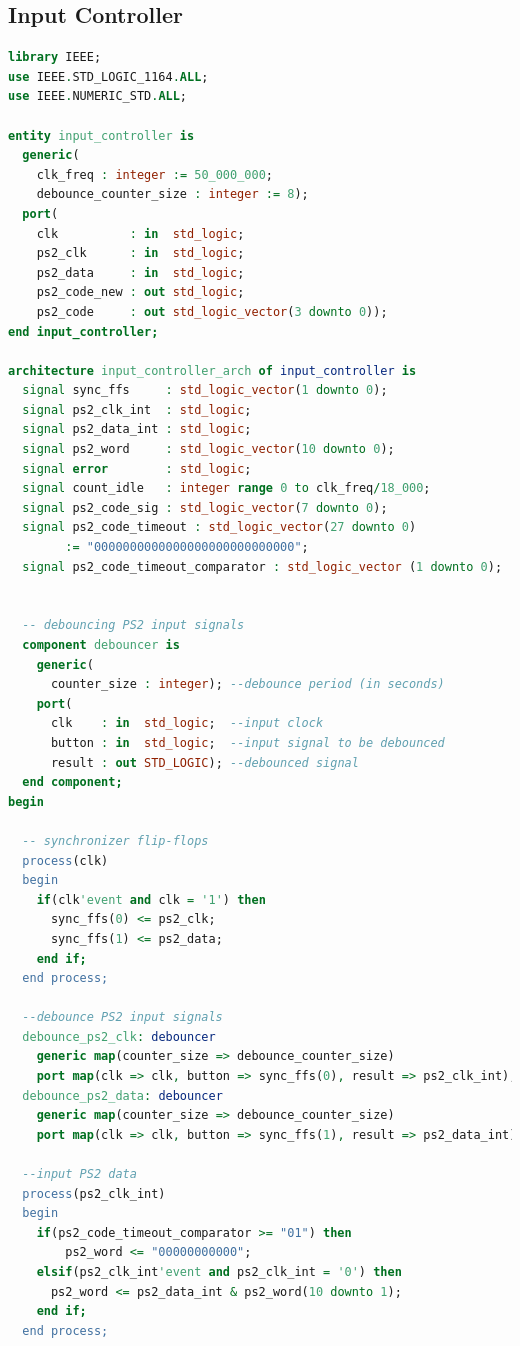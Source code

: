 \documentclass[11pt]{article}
\begin{document}
\begin{appendices}
\begin{lstlisting}[language=VHDL]
\end{lstlisting}

\subsection{Input Controller}

\begin{lstlisting}[language=VHDL]
library IEEE;
use IEEE.STD_LOGIC_1164.ALL;
use IEEE.NUMERIC_STD.ALL;

entity input_controller is
  generic(
    clk_freq : integer := 50_000_000;
    debounce_counter_size : integer := 8);
  port(
    clk          : in  std_logic;
    ps2_clk      : in  std_logic;
    ps2_data     : in  std_logic;
    ps2_code_new : out std_logic;
    ps2_code     : out std_logic_vector(3 downto 0));
end input_controller;

architecture input_controller_arch of input_controller is
  signal sync_ffs     : std_logic_vector(1 downto 0);
  signal ps2_clk_int  : std_logic;
  signal ps2_data_int : std_logic;
  signal ps2_word     : std_logic_vector(10 downto 0);
  signal error        : std_logic;
  signal count_idle   : integer range 0 to clk_freq/18_000;
  signal ps2_code_sig : std_logic_vector(7 downto 0);
  signal ps2_code_timeout : std_logic_vector(27 downto 0) 
  		:= "0000000000000000000000000000";
  signal ps2_code_timeout_comparator : std_logic_vector (1 downto 0);


  -- debouncing PS2 input signals
  component debouncer is
    generic(
      counter_size : integer); --debounce period (in seconds) 
    port(
      clk    : in  std_logic;  --input clock
      button : in  std_logic;  --input signal to be debounced
      result : out STD_LOGIC); --debounced signal
  end component;
begin

  -- synchronizer flip-flops
  process(clk)
  begin
    if(clk'event and clk = '1') then
      sync_ffs(0) <= ps2_clk;
      sync_ffs(1) <= ps2_data;
    end if;
  end process;

  --debounce PS2 input signals
  debounce_ps2_clk: debouncer
    generic map(counter_size => debounce_counter_size)
    port map(clk => clk, button => sync_ffs(0), result => ps2_clk_int);
  debounce_ps2_data: debouncer
    generic map(counter_size => debounce_counter_size)
    port map(clk => clk, button => sync_ffs(1), result => ps2_data_int);

  --input PS2 data
  process(ps2_clk_int)
  begin
    if(ps2_code_timeout_comparator >= "01") then
        ps2_word <= "00000000000";
    elsif(ps2_clk_int'event and ps2_clk_int = '0') then
      ps2_word <= ps2_data_int & ps2_word(10 downto 1);
    end if;
  end process;


\end{lstlisting}
\end{appendices}
\end{document}
